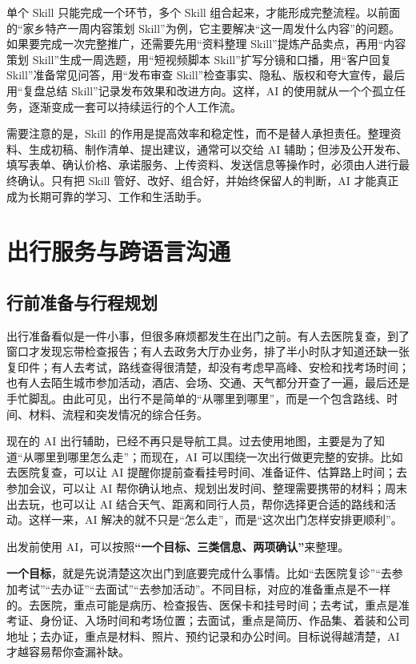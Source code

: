 单个 Skill 只能完成一个环节，多个 Skill 组合起来，才能形成完整流程。以前面的“家乡特产一周内容策划 Skill”为例，它主要解决“这一周发什么内容”的问题。如果要完成一次完整推广，还需要先用“资料整理 Skill”提炼产品卖点，再用“内容策划 Skill”生成一周选题，用“短视频脚本 Skill”扩写分镜和口播，用“客户回复 Skill”准备常见问答，用“发布审查 Skill”检查事实、隐私、版权和夸大宣传，最后用“复盘总结 Skill”记录发布效果和改进方向。这样，AI 的使用就从一个个孤立任务，逐渐变成一套可以持续运行的个人工作流。

需要注意的是，Skill 的作用是提高效率和稳定性，而不是替人承担责任。整理资料、生成初稿、制作清单、提出建议，通常可以交给 AI 辅助；但涉及公开发布、填写表单、确认价格、承诺服务、上传资料、发送信息等操作时，必须由人进行最终确认。只有把 Skill 管好、改好、组合好，并始终保留人的判断，AI 才能真正成为长期可靠的学习、工作和生活助手。

\section{出行服务与跨语言沟通}

\subsection{行前准备与行程规划}

出行准备看似是一件小事，但很多麻烦都发生在出门之前。有人去医院复查，到了窗口才发现忘带检查报告；有人去政务大厅办业务，排了半小时队才知道还缺一张复印件；有人去考试，路线查得很清楚，却没有考虑早高峰、安检和找考场时间；也有人去陌生城市参加活动，酒店、会场、交通、天气都分开查了一遍，最后还是手忙脚乱。由此可见，出行不是简单的“从哪里到哪里”，而是一个包含路线、时间、材料、流程和突发情况的综合任务。

现在的 AI 出行辅助，已经不再只是导航工具。过去使用地图，主要是为了知道“从哪里到哪里怎么走”；而现在，AI 可以围绕一次出行做更完整的安排。比如去医院复查，可以让 AI 提醒你提前查看挂号时间、准备证件、估算路上时间；去参加会议，可以让 AI 帮你确认地点、规划出发时间、整理需要携带的材料；周末出去玩，也可以让 AI 结合天气、距离和同行人员，帮你选择更合适的路线和活动。这样一来，AI 解决的就不只是“怎么走”，而是“这次出门怎样安排更顺利”。

出发前使用 AI，可以按照\textbf{“一个目标、三类信息、两项确认”}来整理。

\textbf{一个目标}，就是先说清楚这次出门到底要完成什么事情。比如“去医院复诊”“去参加考试”“去办证”“去面试”“去参加活动”。不同目标，对应的准备重点是不一样的。去医院，重点可能是病历、检查报告、医保卡和挂号时间；去考试，重点是准考证、身份证、入场时间和考场位置；去面试，重点是简历、作品集、着装和公司地址；去办证，重点是材料、照片、预约记录和办公时间。目标说得越清楚，AI 才越容易帮你查漏补缺。


